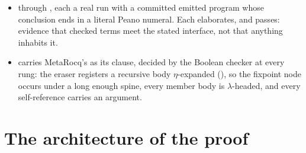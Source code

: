 \begin{itemize}
\item {}  through , each a real
 run with a committed emitted program whose conclusion ends in a literal Peano numeral.
Each elaborates, and  passes: evidence that checked terms meet the
stated interface, not that anything inhabits it.
\item {}  carries MetaRocq's
 as its  clause, decided by the Boolean checker at every
rung: the eraser registers a recursive body $\eta$-expanded (), so the fixpoint
node occurs under a long enough spine, every member body is $\lambda$-headed, and every
self-reference carries an argument.
\end{itemize}

\section{The architecture of the proof}
\label{sec:intro:architecture}

